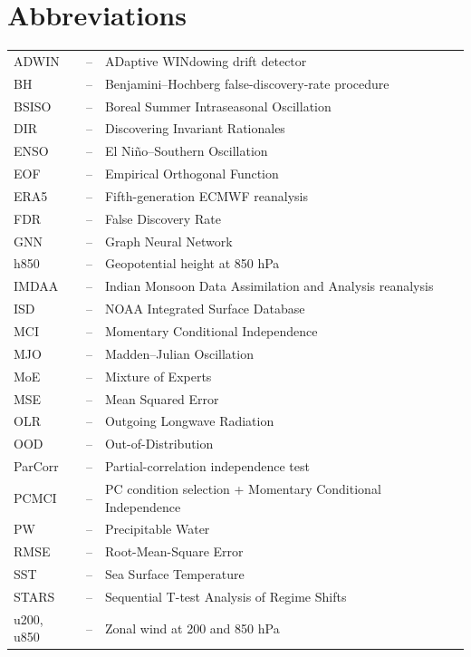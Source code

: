 \chapter*{Abbreviations}
\begin{tabular}{lll}
ADWIN   & -- & ADaptive WINdowing drift detector\\
BH      & -- & Benjamini--Hochberg false-discovery-rate procedure\\
BSISO   & -- & Boreal Summer Intraseasonal Oscillation\\
DIR     & -- & Discovering Invariant Rationales\\
ENSO    & -- & El Ni\~{n}o--Southern Oscillation\\
EOF     & -- & Empirical Orthogonal Function\\
ERA5    & -- & Fifth-generation ECMWF reanalysis\\
FDR     & -- & False Discovery Rate\\
GNN     & -- & Graph Neural Network\\
h850    & -- & Geopotential height at 850 hPa\\
IMDAA   & -- & Indian Monsoon Data Assimilation and Analysis reanalysis\\
ISD     & -- & NOAA Integrated Surface Database\\
MCI     & -- & Momentary Conditional Independence\\
MJO     & -- & Madden--Julian Oscillation\\
MoE     & -- & Mixture of Experts\\
MSE     & -- & Mean Squared Error\\
OLR     & -- & Outgoing Longwave Radiation\\
OOD     & -- & Out-of-Distribution\\
ParCorr & -- & Partial-correlation independence test\\
PCMCI   & -- & PC condition selection + Momentary Conditional Independence\\
PW      & -- & Precipitable Water\\
RMSE    & -- & Root-Mean-Square Error\\
SST     & -- & Sea Surface Temperature\\
STARS   & -- & Sequential T-test Analysis of Regime Shifts\\
u200, u850 & -- & Zonal wind at 200 and 850 hPa\\
\end{tabular}
